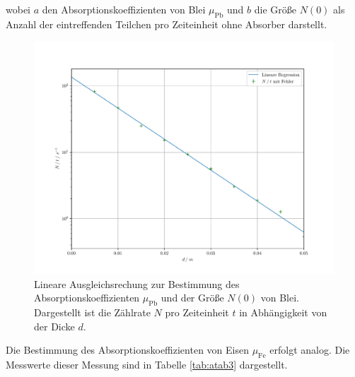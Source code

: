 wobei $a$ den Absorptionskoeffizienten von Blei $\mu_\text{Pb}$ und $b$ die Größe $N\left(0\right)$ als Anzahl der eintreffenden
Teilchen pro Zeiteinheit ohne Absorber darstellt. 
\FloatBarrier
\begin{figure}[h]
    \centering
    \includegraphics[width=13.5cm]{blei.pdf}
    \caption{Lineare Ausgleichsrechung zur Bestimmung des Absorptionskoeffizienten $\mu_\text{Pb}$ und der Größe $N\left(0\right)$ von Blei. 
    Dargestellt ist die Zählrate $N$ pro Zeiteinheit $t$ in Abhängigkeit von der Dicke $d$.}
    \label{fig:afig1}
\end{figure}
\FloatBarrier
\noindent
Die Bestimmung des Absorptionskoeffizienten von Eisen $\mu_\text{Fe}$ erfolgt analog. Die Messwerte dieser Messung sind
in Tabelle \ref{tab:atab3} dargestellt.
\FloatBarrier
